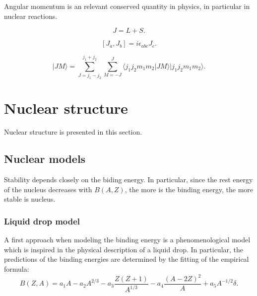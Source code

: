 \documentclass[openany]{book}
\begin{document}
Angular momentum is an relevant conserved quantity in physics, in particular in nuclear reactions.

\begin{equation} \label{eq:angularMomentum_definition}
	J = L + S.
\end{equation}

\begin{equation} \label{eq:angularMomentum_conmutation}
	[J_a, J_b]  = i \epsilon_{abc} J_c.
\end{equation}

\begin{equation} \label{eq:angularMomentum_coupledBaseExpansion}
 |JM \rangle = \sum_{J = j_1 - j_2}^{j_1 + j_2} \sum_{M = -J}^{J} {\langle j_1j_2m_1m_2 | JM \rangle  |j_1j_2m_1m_2\rangle}.
\end{equation}



\section{Nuclear structure} \label{sec:nuclearStructure}

Nuclear structure is presented in this section.

\subsection{Nuclear models}  \label{sub:nuclearModels}

Stability depends closely on the biding energy. In particular, since the rest energy of the nucleus decreases with $B(A, Z)$, the more is the binding energy, the more stable is nucleus.

\subsubsection{Liquid drop model} \label{ssub:liquidDropModel}

A first approach when modeling the binding energy is a phenomenological model which is inspired in the physical description of a liquid drop. In particular, the predictions of the binding energies are determined by the fitting of the empirical formula: \\ 

\begin{equation} \label{eq:liquidDrop_bindingEnergy}
	B(Z,A )= a_1A - a_2A^{2/3} - a_3 \frac{Z(Z+1)}{A^{1/3}} - a_4 \frac{(A - 2Z)^2}{A}   +   a_5 A^{-1/2} \delta.
\end{equation}
\end{document}
